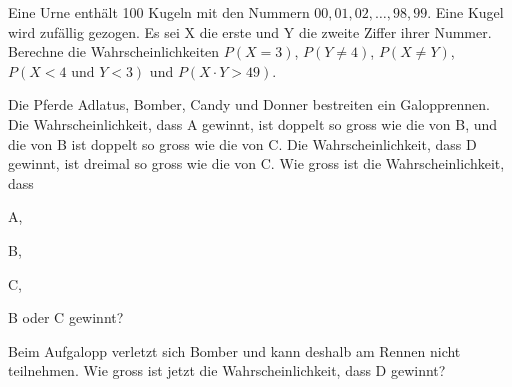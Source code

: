 \documentclass[%
11pt,%
twoside,%
titlepage,%
german,%
headsepline%
]{scrartcl}
\newcommand{\spaltenheight}{\rule{0mm}{3ex}}
\newcommand{\spaltensep}{\\[1ex]}
\begin{document}


\begin{ueb}
Eine Urne enthält 100 Kugeln mit den Nummern $00,01,02, \dots ,98,99$. Eine Kugel wird zufällig gezogen. Es sei X die erste und Y die zweite Ziffer ihrer Nummer. Berechne die Wahrscheinlichkeiten $P(X = 3)$, $P(Y\neq 4)$, $P(X \neq Y)$, $P(X < 4\text{ und } Y < 3)$ und $P(X\cdot Y > 49)$.
\end{ueb}

\begin{ueb}[Pferderennen]
Die Pferde Adlatus, Bomber, Candy und Donner bestreiten ein Galopprennen. Die Wahrscheinlichkeit, dass A gewinnt, ist doppelt so gross wie die von B, und die von B ist doppelt so gross wie die von C. Die Wahrscheinlichkeit, dass D gewinnt, ist dreimal so gross wie die von C. Wie gross ist die Wahrscheinlichkeit, dass

\begin{minipage}{3.8cm}
\begin{enumeratea}
\item A,
\item B,
\end{enumeratea}
\end{minipage}
\begin{minipage}{3.9cm}
\begin{enumeratea}
\addtocounter{enumi}{2}
\item C,
\item B oder C gewinnt?
\end{enumeratea}
\end{minipage}

Beim Aufgalopp verletzt sich Bomber und kann deshalb am Rennen nicht teilnehmen. Wie gross
ist jetzt die Wahrscheinlichkeit, dass D gewinnt?
\end{ueb}
\end{document}
